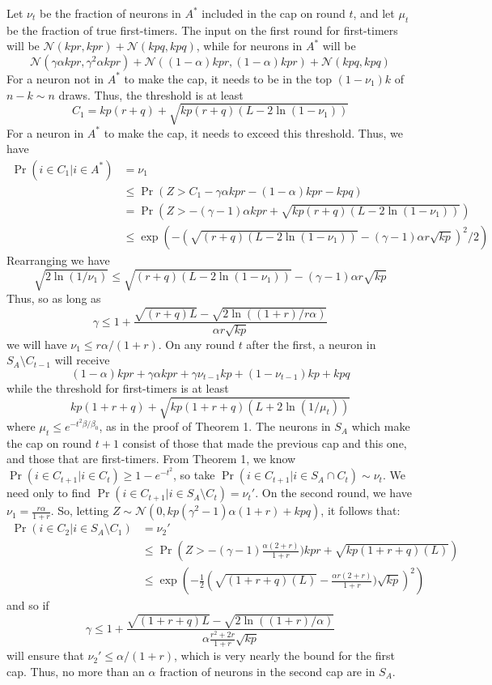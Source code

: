\documentclass[final,12pt]{colt2022} %
\newcommand{\assmcore}[1]{{#1}^*}
\newcommand{\stimcore}[1]{S_{#1}}
\begin{document}
Let $\nu_t$ be the fraction of neurons in $A^*$ included in the cap on round $t$, and let $\mu_t$ be the fraction of true first-timers. The input on the first round for first-timers will be $\mathcal N(kpr, kpr) + \mathcal N(kpq, kpq)$, while for neurons in $\assmcore{A}$ will be 
\[\mathcal N(\gamma \alpha kpr, \gamma^2 \alpha kpr) + \mathcal N((1-\alpha)kpr, (1-\alpha)kpr) + \mathcal N(kpq, kpq)\] 
For a neuron not in $\assmcore{A}$ to make the cap, it needs to be in the top $(1 - \nu_1)k$ of $n - k \sim n$ draws. Thus, the threshold is at least \[C_1 = kp(r+q) + \sqrt{kp(r+q)(L - 2\ln(1-\nu_1))}\]
For a neuron in $\assmcore{A}$ to make the cap, it needs to exceed this threshold. Thus, we have \begin{align*}
    \Pr (i \in C_1 | i \in \assmcore{A}) &= \nu_1\\
    &\leq \Pr (Z > C_1 - \gamma \alpha kpr - (1 - \alpha)kpr - kpq)\\
    &= \Pr \left(Z > - (\gamma -1) \alpha kpr + \sqrt{kp(r+q)(L - 2\ln(1-\nu_1))}\right)\\
    &\leq \exp\left(-(\sqrt{(r+q)(L - 2\ln(1-\nu_1))} - (\gamma -1) \alpha r\sqrt{kp})^2/2 \right)
\end{align*} Rearranging we have \[\sqrt{2\ln(1/\nu_1)} \leq \sqrt{(r+q)(L - 2\ln(1-\nu_1))} - (\gamma -1) \alpha r\sqrt{kp}\] Thus, so as long as \[\gamma \leq 1 + \frac{\sqrt{(r+q)L} - \sqrt{2\ln((1+r)/r\alpha)}}{\alpha r \sqrt{kp}}\] we will have $\nu_1 \leq r\alpha/(1+r)$. 
On any round $t$ after the first, a neuron in $\stimcore{A} \setminus C_{t-1}$ will receive \[(1-\alpha)kpr + \gamma\alpha kpr + \gamma \nu_{t-1} kp + (1 - \nu_{t-1})kp + kpq\] while the threshold for first-timers is at least \[kp(1 + r + q) + \sqrt{kp(1+r+q)(L+2\ln(1/\mu_t))}\] where $\mu_t \leq e^{-t^2\beta/\beta_0}$, as in the proof of Theorem 1.
The neurons in $\stimcore{A}$ which make the cap on round $t+1$ consist of those that made the previous cap and this one, and those that are first-timers. From Theorem 1, we know $\Pr (i \in C_{t+1} | i \in C_t) \geq 1 - e^{-t^2}$, so take $\Pr (i \in C_{t+1} | i \in \stimcore{A} \cap C_t) \sim \nu_t$. We need only to find $\Pr (i \in C_{t+1} | i \in \stimcore{A} \setminus C_t) = \nu_t'$. On the second round, we have $\nu_1 = \frac{r\alpha}{1+r}$. So, letting $Z\sim \mathcal N(0, kp(\gamma^2 - 1)\alpha(1+r) + kpq)$, it follows that: \begin{align*}
    \Pr (i \in C_2 | i \in \stimcore{A} \setminus C_1)&= \nu_2'\\
    &\leq \Pr \left(Z > -(\gamma - 1)\frac{\alpha(2+r)}{1+r})kpr + \sqrt{kp(1+r+q)(L)}  \right)\\
    &\leq \exp\left(-\frac{1}{2}\left( \sqrt{(1+r+q)(L)} - \frac{\alpha r(2+r)}{1+r})\sqrt{kp} \right)^2 \right)
\end{align*} and so if \[\gamma \leq 1 + \frac{\sqrt{(1+r+q)L} - \sqrt{2\ln((1+r)/\alpha)}}{\alpha \frac{r^2+2r}{1+r}\sqrt{kp}}\] will ensure that $\nu_2' \leq \alpha/(1+r)$, which is very nearly the bound for the first cap. Thus, no more than an $\alpha$ fraction of neurons in the second cap are in $\stimcore{A}$.
\end{document}
